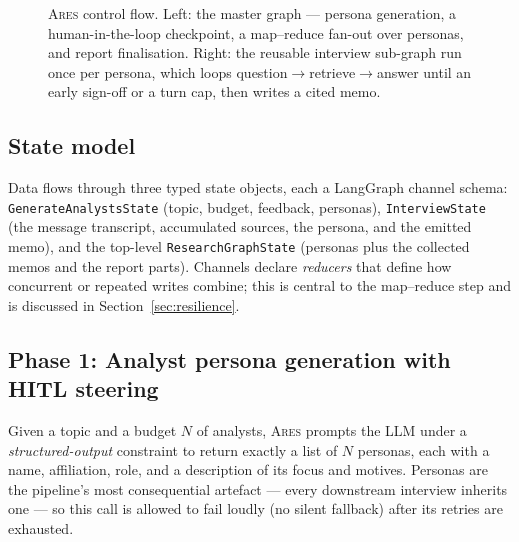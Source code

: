 \documentclass[10pt,twocolumn]{article}
\newcommand{\ares}{\textsc{Ares}}
\newcommand{\code}[1]{\texttt{\small #1}}
\begin{document}
\begin{figure}[t]
\caption{\ares{} control flow. Left: the master graph --- persona generation, a
human-in-the-loop checkpoint, a map--reduce fan-out over personas, and report
finalisation. Right: the reusable interview sub-graph run once per persona,
which loops question$\rightarrow$retrieve$\rightarrow$answer until an early
sign-off or a turn cap, then writes a cited memo.}
\label{fig:arch}
\end{figure}

\subsection{State model}
Data flows through three typed state objects, each a LangGraph channel schema:
\code{GenerateAnalystsState} (topic, budget, feedback, personas),
\code{InterviewState} (the message transcript, accumulated sources, the persona,
and the emitted memo), and the top-level \code{ResearchGraphState} (personas plus
the collected memos and the report parts). Channels declare \emph{reducers} that
define how concurrent or repeated writes combine; this is central to the
map--reduce step and is discussed in Section~\ref{sec:resilience}.

\subsection{Phase 1: Analyst persona generation with HITL steering}
\label{sec:phase1}
Given a topic and a budget $N$ of analysts, \ares{} prompts the LLM under a
\emph{structured-output} constraint to return exactly a list of $N$ personas,
each with a name, affiliation, role, and a description of its focus and motives.
Personas are the pipeline's most consequential artefact --- every downstream
interview inherits one --- so this call is allowed to fail loudly (no silent
fallback) after its retries are exhausted.
\end{document}
